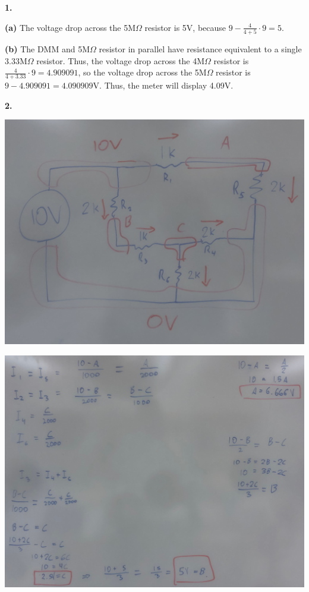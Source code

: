 \documentclass{article}
\begin{document}
\medskip\noindent\textbf{1.}

	\textbf{(a)} The voltage drop across the 5M$\Omega$ resistor is 5V, because $9 - \frac{4}{4+5} \cdot 9 = 5$.

	\textbf{(b)} The DMM and 5M$\Omega$ resistor in parallel have resistance equivalent to a single $3.33$M$\Omega$ resistor. Thus, the voltage drop across the 4M$\Omega$ resistor is $\frac4{4+3.33}\cdot9 = 4.909091$, so the voltage drop across the 5M$\Omega$ resistor is $9 - 4.909091 = 4.090909$V. Thus, the meter will display 4.09V.

\newpage\noindent\textbf{2.}

    \begin{center}
        \includegraphics[scale=.07]{IMG_0869.jpg}

        \includegraphics[scale=.1]{IMG_0870.jpg}
        

\end{center}
\end{document}
